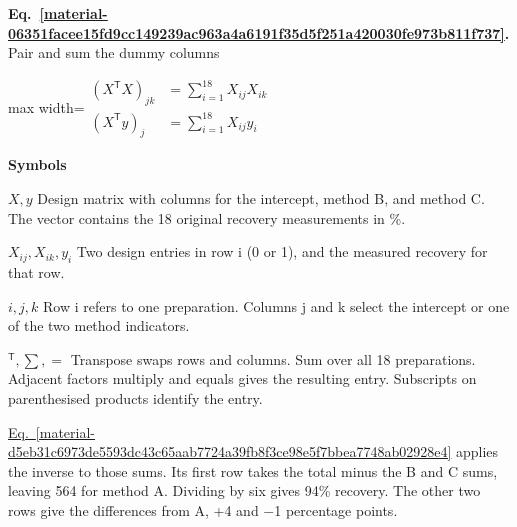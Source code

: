 \documentclass[11pt,a4paper]{article}
\begin{document}
\par\medskip
\noindent\begin{minipage}{\linewidth}
\label{material-06351facee15fd9cc149239ac963a4a6191f35d5f251a420030fe973b811f737}
\noindent\textbf{Eq.~\ref*{material-06351facee15fd9cc149239ac963a4a6191f35d5f251a420030fe973b811f737}.} Pair and sum the dummy columns\par\nopagebreak
\begin{center}\begin{adjustbox}{max width=\linewidth}$\displaystyle \begin{aligned}(X^{\mathsf T}X)_{jk}&=\sum_{i=1}^{18}X_{ij}X_{ik}\\[.45em](X^{\mathsf T}y)_j&=\sum_{i=1}^{18}X_{ij}y_i\end{aligned}$\end{adjustbox}\end{center}

\par\noindent\textbf{Symbols}

\par\noindent\textbf{\(X,y\)} Design matrix with columns for the intercept, method B, and method C. The vector contains the 18 original recovery measurements in \%.

\par\noindent\textbf{\(X_{ij},X_{ik},y_i\)} Two design entries in row i (0 or 1), and the measured recovery for that row.

\par\noindent\textbf{\(i,j,k\)} Row i refers to one preparation. Columns j and k select the intercept or one of the two method indicators.

\par\noindent\textbf{\({}^{\mathsf T},\sum,=\)} Transpose swaps rows and columns. Sum over all 18 preparations. Adjacent factors multiply and equals gives the resulting entry. Subscripts on parenthesised products identify the entry.

\end{minipage}\par
\medskip

\hyperref[material-d5eb31c6973de5593dc43c65aab7724a39fb8f3ce98e5f7bbea7748ab02928e4]{Eq.~\ref*{material-d5eb31c6973de5593dc43c65aab7724a39fb8f3ce98e5f7bbea7748ab02928e4}} applies the inverse to those sums. Its first row takes the total minus the B and C sums, leaving 564 for method A. Dividing by six gives 94\% recovery. The other two rows give the differences from A, +4 and \ensuremath{-}1 percentage points.
\end{document}
